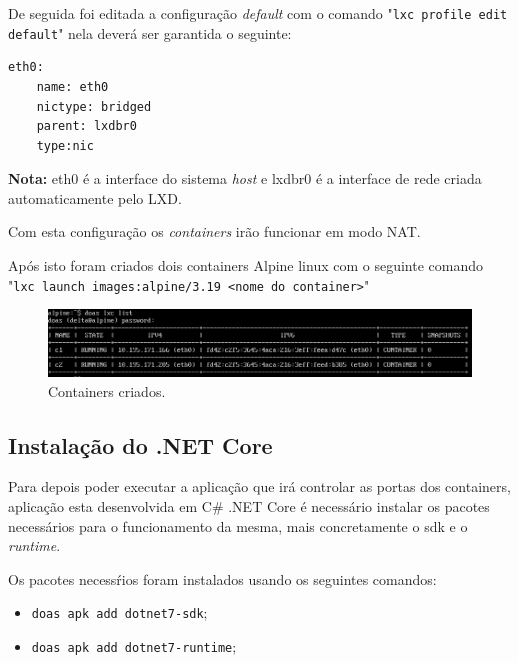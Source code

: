 De seguida foi editada a configuração \textit{default} com o 
comando "\texttt{lxc profile edit default}" nela deverá ser garantida o
seguinte:

\begin{lstlisting}[language=csh, caption={edição do perfil padrão}]
  eth0:
    name: eth0
    nictype: bridged
    parent: lxdbr0
    type:nic

\end{lstlisting}

\textbf{Nota:} eth0 é a interface do sistema \textit{host} e lxdbr0 é a interface
de rede criada automaticamente pelo LXD.

Com esta configuração os \textit{containers} irão funcionar em modo NAT.


Após isto foram criados dois containers Alpine linux com o seguinte 
comando "\texttt{lxc launch images:alpine/3.19 <nome do container>}"

\begin{figure}[ht]
\begin{center}
\includegraphics[width=14cm]{figs/lista de containers.png}
\caption{Containers criados.}
\label{fig:bookstack}
\end{center}
\end{figure}



\subsection{Instalação do .NET Core}


Para depois poder executar a aplicação que irá controlar as portas dos containers,
aplicação esta desenvolvida em C\# .NET Core é necessário instalar os pacotes necessários
para o funcionamento da mesma, mais concretamente o sdk e o \textit{runtime}.

Os pacotes necessŕios foram instalados usando os seguintes comandos:
\begin{itemize}
    \item \texttt{doas apk add dotnet7-sdk};
    \item \texttt{doas apk add dotnet7-runtime};
\end{itemize}




